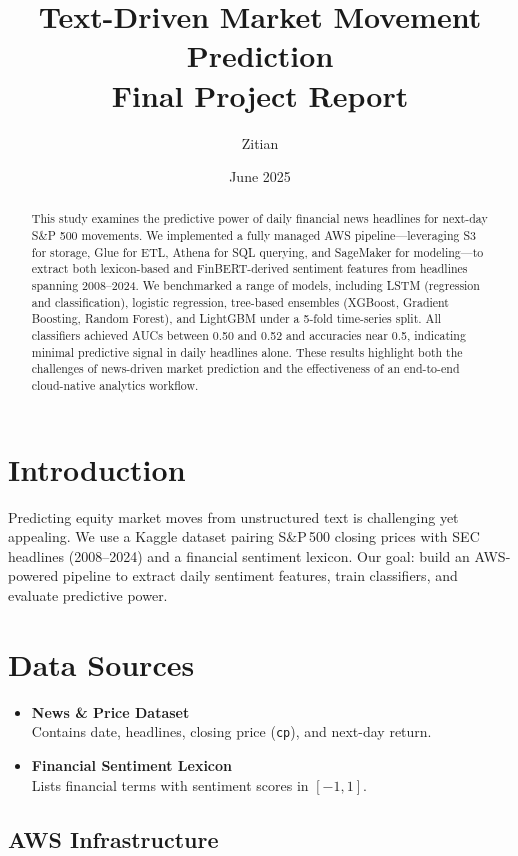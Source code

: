 \documentclass[11pt,a4paper]{article}
\title{Text-Driven Market Movement Prediction\\
\large Final Project Report}
\author{Zitian}
\date{June 2025}
\begin{document}
\maketitle

\begin{abstract}
This study examines the predictive power of daily financial news headlines for next-day S\&P 500 movements. We implemented a fully managed AWS pipeline—leveraging S3 for storage, Glue for ETL, Athena for SQL querying, and SageMaker for modeling—to extract both lexicon-based and FinBERT-derived sentiment features from headlines spanning 2008–2024. We benchmarked a range of models, including LSTM (regression and classification), logistic regression, tree-based ensembles (XGBoost, Gradient Boosting, Random Forest), and LightGBM under a 5-fold time-series split. All classifiers achieved AUCs between 0.50 and 0.52 and accuracies near 0.5, indicating minimal predictive signal in daily headlines alone. These results highlight both the challenges of news-driven market prediction and the effectiveness of an end-to-end cloud-native analytics workflow.
\end{abstract}
    

\section{Introduction}
Predicting equity market moves from unstructured text is challenging yet appealing. We use a Kaggle dataset pairing S\&P\,500 closing prices with SEC headlines (2008–2024) and a financial sentiment lexicon. Our goal: build an AWS-powered pipeline to extract daily sentiment features, train classifiers, and evaluate predictive power.

\section{Data Sources}
\begin{itemize}
  \item \textbf{News \& Price Dataset} \\
    Contains date, headlines, closing price (\texttt{cp}), and next-day return.
  \item \textbf{Financial Sentiment Lexicon} \\
    Lists financial terms with sentiment scores in $[-1,1]$.
\end{itemize}

\subsection{AWS Infrastructure}
\end{document}
